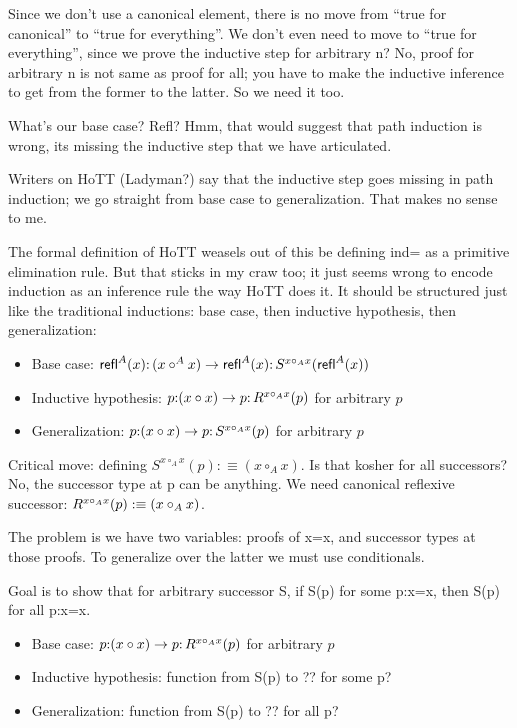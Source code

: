 \documentclass{article}
\begin{document}
Since we don't use a canonical element, there is no move from ``true
for canonical'' to ``true for everything''.  We don't even need to
move to ``true for everything'', since we prove the inductive step for
arbitrary n?  No, proof for arbitrary n is not same as proof for all;
you have to make the inductive inference to get from the former to the
latter.  So we need it too.

What's our base case?  Refl?  Hmm, that would suggest that path
induction is wrong, its missing the inductive step that we have
articulated.

Writers on HoTT (Ladyman?) say that the inductive step goes missing in
path induction; we go straight from base case to generalization.  That
makes no sense to me.

The formal definition of HoTT weasels out of this be defining ind= as
a primitive elimination rule.  But that sticks in my craw too; it just
seems wrong to encode induction as an inference rule the way HoTT does
it.  It should be structured just like the traditional inductions:
base case, then inductive hypothesis, then generalization:

\begin{itemize}
\item Base case:  \(\textsf{refl}^A(x){:}\,(x\circ^A x)\to \textsf{refl}^A(x){:}\,S^{x\circ_Ax}(\textsf{refl}^A(x))\)
\item Inductive hypothesis:  \(p{:}(x\circ x)\to p{:}\,R^{x\circ_Ax}(p)\) for arbitrary \(p\)
\item Generalization:  \(p{:}(x\circ x)\to p{:}\,S^{x\circ_Ax}(p)\) for arbitrary \(p\)
\end{itemize}

Critical move: defining \(S^{x\circ_Ax}(p) :\equiv (x\circ_Ax)\).  Is
that kosher for all successors?  No, the successor type at p can be
anything.  We need canonical reflexive successor:  \(R^{x\circ_Ax}(p) :\equiv (x\circ_Ax)\).

The problem is we have two variables: proofs of x=x, and successor
types at those proofs.  To generalize over the latter we must use
conditionals.

Goal is to show that for arbitrary successor S, if S(p) for some
p:x=x, then S(p) for all p:x=x.

\begin{itemize}
\item Base case:  \(p{:}(x\circ x)\to p{:}\,R^{x\circ_Ax}(p)\) for arbitrary \(p\)
\item Inductive hypothesis: function from S(p) to ?? for some p?
\item Generalization: function from S(p) to ?? for all p?
\end{itemize}
\end{document}
